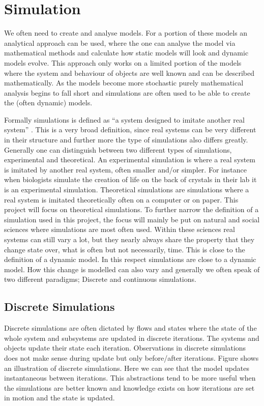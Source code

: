 \section{Simulation}
We often need to create and analyse models. For a portion of these models an analytical approach can be used, where the one can analyse the model via mathematical methods and calculate how static models will look and dynamic models evolve. This approach only works on a limited portion of the models where the system and behaviour of objects are well known and can be described mathematically. As the models become more stochastic purely mathematical analysis begins to fall short and simulations are often used to be able to create the (often dynamic) models.

Formally simulations is defined as \enquote{a system designed to imitate another real system} . This is a very broad definition, since real systems can be very different in their structure and further more the type of simulations also differs greatly. Generally one can distinguish between two different types of simulations, experimental and theoretical. An experimental simulation is where a real system is imitated by another real system, often smaller and/or simpler. For instance when biologists simulate the creation of life on the back of crystals in their lab it is an experimental simulation. Theoretical simulations are simulations where a real system is imitated theoretically often on a computer or on paper. This project will focus on theoretical simulations. To further narrow the definition of a simulation used in this project, the focus will mainly be put on natural and social sciences where simulations are most often used. Within these sciences real systems can still vary a lot, but they nearly always share the property that they change state over, what is often but not necessarily, time. This is close to the definition of a dynamic model. In this respect simulations are close to a dynamic model.
How this change is modelled can also vary and generally we often speak of two different paradigms; Discrete and continuous simulations.

\subsection{Discrete Simulations}
Discrete simulations are often dictated by flows and states where the state of the whole system and subsystems are updated in discrete iterations. The systems and objects update their state each iteration. Observations in discrete simulations does not make sense during update but only before/after iterations. Figure  shows an illustration of discrete simulations. Here we can see that the model updates instantaneous between iterations. This abstractions tend to be more useful when the simulations are better known and knowledge exists on how iterations are set in motion and the state is updated.

